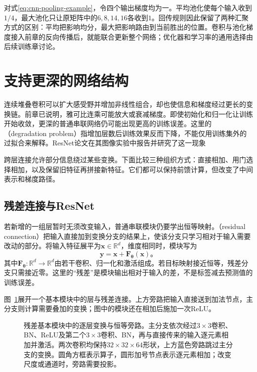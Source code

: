 对式\eqref{eq:cnn-pooling-example}，令四个输出梯度均为一。平均池化使每个输入收到$1/4$，最大池化只让原矩阵中的$6,8,14,16$各收到$1$。回传规则因此保留了两种汇聚方式的区别：平均把影响均分，最大把影响路由到当前胜出的位置。卷积与池化梯度接入前章的反向传播后，就能联合更新整个网络；优化器和学习率的通用选择由后续训练章讨论。

\section{支持更深的网络结构}
\label{sec:cnn-deep-structures}

连续堆叠卷积可以扩大感受野并增加非线性组合，却也使信息和梯度经过更长的变换链。前章已说明，雅可比连乘可能放大或衰减梯度。即使初始化和归一化让训练开始收敛，更深的普通串联网络仍可能出现更高的训练误差。这里的（degradation problem）指增加层数后训练效果反而下降，不能仅用训练集外的过拟合来解释。ResNet论文在其图像实验中报告并研究了这一现象

跨层连接允许部分信息绕过某些变换。下面比较三种组织方式：直接相加、用门选择相加，以及保留旧特征再拼接新特征。它们都可以保持前馈计算，但改变了中间表示和梯度路径。

\subsection{残差连接与ResNet}
\label{sec:cnn-resnet}

若新增的一组层暂时无须改变输入，普通串联模块仍要学出恒等映射。（residual connection）把输入直接加到变换分支的结果上，使该分支只学习相对于输入需要改动的部分。将输入特征展平为$\bm x\in\mathbb R^d$，维度相同时，模块写为
\begin{equation}
  \bm y=\bm x+\bm F_{\bm\theta}(\bm x)\text{。}
  \label{eq:cnn-residual-block}
\end{equation}
其中$\bm F_{\bm\theta}:\mathbb R^d\to\mathbb R^d$由若干卷积、归一化和激活组成。若目标映射接近恒等，残差分支只需接近零。这里的“残差”是模块输出相对于输入的差，不是标签减去预测值的训练误差。

图~\ref{fig:cnn-resnet}展开一个基本模块中的层与残差连接。上方旁路把输入直接送到加法节点，主分支则计算需要叠加的变换；图中的模块还在相加后施加一次ReLU。
\begin{figure}[htbp]
  \centering
  
  \caption{残差基本模块中的逐层变换与恒等旁路。主分支依次经过$3\times3$卷积、BN、ReLU及第二个$3\times3$卷积、BN，再与直接传来的输入逐元素相加并激活。两次卷积均保持$32\times32\times64$形状，上方蓝色旁路跳过主分支的变换。圆角方框表示算子，圆形加号节点表示逐元素相加；改变尺度或通道时，旁路需要投影。}
  \label{fig:cnn-resnet}
\end{figure}
\FloatBarrier

